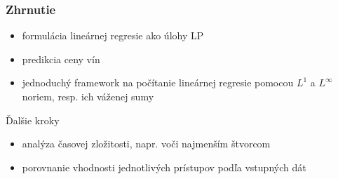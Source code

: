 \documentclass[presentation.tex]{subfiles}
\begin{document}
	
\begin{frame}
	\frametitle{Zhrnutie}

	\begin{itemize}
		\item formulácia lineárnej regresie ako úlohy LP
		\item predikcia ceny vín
		\item jednoduchý framework na počítanie lineárnej regresie pomocou $L^1$ a $L^{\infty}$ noriem, resp. ich váženej sumy
	\end{itemize}
	
	\vspace{0.25cm}
	
	Ďalšie kroky
	\begin{itemize}
		\item analýza časovej zložitosti, napr. voči najmenším štvorcom
		\item porovnanie vhodnosti jednotlivých prístupov podľa vstupných dát
	\end{itemize}

\end{frame}
	
\end{document}
